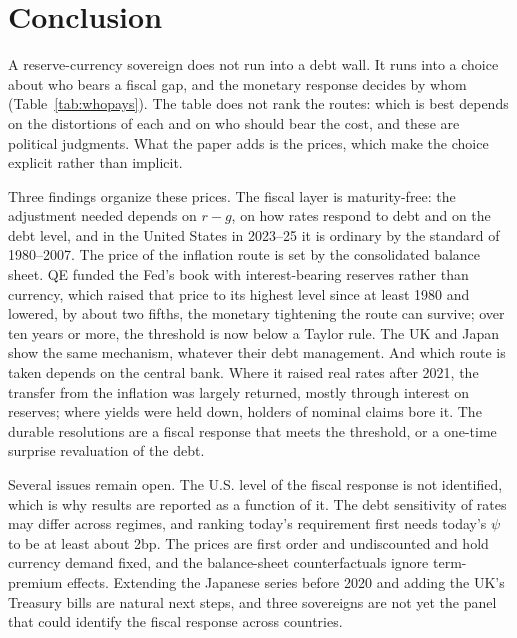 \section{Conclusion}\label{sec:conclusion}

A reserve-currency sovereign does not run into a debt wall. It runs into a choice about who bears a fiscal gap, and the monetary response decides by whom (Table~\ref{tab:whopays}). The table does not rank the routes: which is best depends on the distortions of each and on who should bear the cost, and these are political judgments. What the paper adds is the prices, which make the choice explicit rather than implicit.



Three findings organize these prices. The fiscal layer is maturity-free: the adjustment needed depends on $r-g$, on how rates respond to debt and on the debt level, and in the United States in 2023--25 it is ordinary by the standard of 1980--2007. The price of the inflation route is set by the consolidated balance sheet. QE funded the Fed's book with interest-bearing reserves rather than currency, which raised that price to its highest level since at least 1980 and lowered, by about two fifths, the monetary tightening the route can survive; over ten years or more, the threshold is now below a Taylor rule. The UK and Japan show the same mechanism, whatever their debt management. And which route is taken depends on the central bank. Where it raised real rates after 2021, the transfer from the inflation was largely returned, mostly through interest on reserves; where yields were held down, holders of nominal claims bore it. The durable resolutions are a fiscal response that meets the threshold, or a one-time surprise revaluation of the debt.

Several issues remain open. The U.S. level of the fiscal response is not identified, which is why results are reported as a function of it. The debt sensitivity of rates may differ across regimes, and ranking today's requirement first needs today's $\psi$ to be at least about 2bp. The prices are first order and undiscounted and hold currency demand fixed, and the balance-sheet counterfactuals ignore term-premium effects. Extending the Japanese series before 2020 and adding the UK's Treasury bills are natural next steps, and three sovereigns are not yet the panel that could identify the fiscal response across countries.
